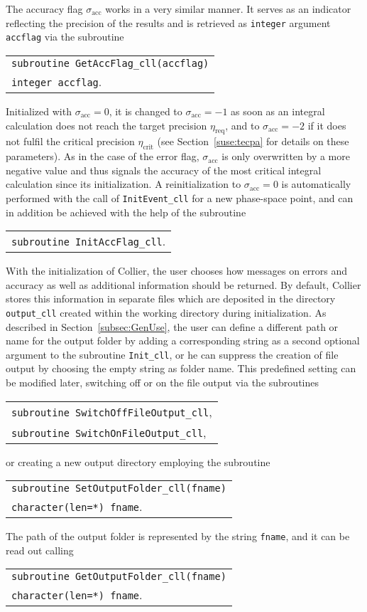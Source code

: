 \documentclass[preprint,sort&compress,12pt]{elsarticle}
\makeatletter
\def\bce{\begin{center}}
\def\ece{\end{center}}
\def\refse#1{\mbox{Section~\ref{#1}}}
\newcommand{\collier}{{\sc Collier}}
\newlength{\parwidth}\newlength{\colonewidth}%
\newcommand{\cpcsub}[1]
{%
\setlength{\parwidth}{\textwidth}\addtolength{\parwidth}{-2.1em}%
\bce
\begin{tabular}[t]{@{}p{\parwidth}@{}}
#1
\end{tabular}
\ece
}%
\makeatother
\begin{document}
The accuracy flag $\sigma_\textrm{acc}$ works in a very similar manner. 
It serves as an indicator reflecting the precision of the results and
is retrieved as {\tt integer} argument {\tt accflag} via the subroutine
\cpcsub{
{\tt subroutine  GetAccFlag\_cll(accflag)}\\
{\tt integer accflag}\;. \\
}
Initialized with $\sigma_\textrm{acc}=0$, it is changed to
$\sigma_\textrm{acc}=-1$ as soon as an integral calculation does not
reach the target precision $\eta_\textrm{req}$, and to
$\sigma_\textrm{acc}=-2$ if it does not fulfil the critical precision
$\eta_\textrm{crit}$ (see \refse{suse:tecpa} for details on these
parameters). As in the case of the error flag, $\sigma_\textrm{acc}$
is only overwritten by a more negative value and thus signals the
accuracy of the most critical integral calculation since its
initialization. A reinitialization to $\sigma_\textrm{acc}=0$ is
automatically performed with the call of {\tt InitEvent\_cll} for a
new phase-space point, and can in addition be achieved with the help
of the subroutine
\cpcsub{
{\tt subroutine  InitAccFlag\_cll}\;.
}

With the initialization of {\collier}, the user chooses how
messages on errors and accuracy as well as additional information
should be returned. By default, {\collier} stores this information in separate files which are deposited in the directory {\tt output\_cll}
created within the working directory during initialization. 
As described in \refse{subsec:GenUse}, the user can define a different
path or name for the output folder by adding a corresponding string as a second optional argument to the subroutine
{\tt Init\_cll}, or he can suppress the creation of file output by choosing the empty string as folder name. This predefined setting
can be modified later, switching off or on the file output via the subroutines
\cpcsub{
{\tt subroutine  SwitchOffFileOutput\_cll}\;,\\
{\tt subroutine  SwitchOnFileOutput\_cll}\;,
}
or creating a new output directory employing the subroutine
\cpcsub{
{\tt subroutine  SetOutputFolder\_cll(fname)}\\
{\tt character(len=*) fname}\;.\\
}
The path of the output folder is represented by the 
string {\tt fname}, and it can be read out calling
\cpcsub{
{\tt subroutine  GetOutputFolder\_cll(fname)}\\
{\tt character(len=*) fname}\;.\\
}
\end{document}
